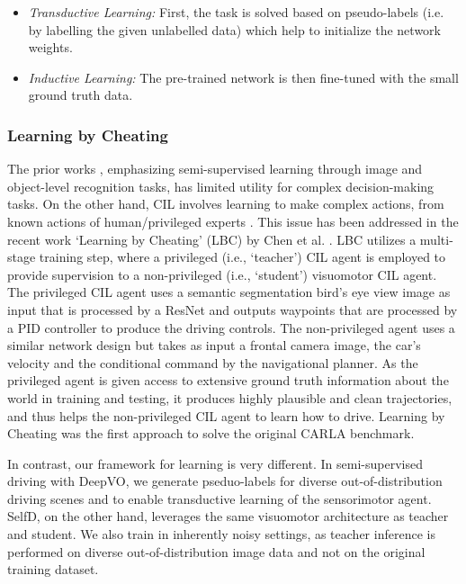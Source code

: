 \documentclass[letterpaper, 12pt]{book}
\theoremstyle{definition}
\theoremstyle{definition}
\theoremstyle{definition}
\theoremstyle{definition}
\theoremstyle{definition}
\begin{document}
\begin{itemize}
\item \emph{Transductive Learning:} First, the task is solved based on pseudo-labels
(i.e. by labelling the given unlabelled data) which help to initialize the
network weights.
\item \emph{Inductive Learning:} The pre-trained network is then fine-tuned with the
small ground truth data.
\end{itemize}

\subsubsection{Learning by Cheating}
\label{sec:orgc656657}
The prior works \cite{Caine2021,Yang2021, Lee2013,Rizve2021}, emphasizing
semi-supervised learning through image and object-level recognition tasks, has
limited utility for complex decision-making tasks. On the other hand, CIL
involves learning to make complex actions, from known actions of
human/privileged experts \cite{Codevilla2017,Codevilla2019,Prakash2021}. This
issue has been addressed in the recent work `Learning by Cheating' (LBC) by Chen
et al. \cite{Chen2019}. LBC utilizes a multi-stage training step, where a
privileged (i.e., ‘teacher’) CIL agent is employed to provide supervision to a
non-privileged (i.e., ‘student’) visuomotor CIL agent. The privileged CIL agent
uses a semantic segmentation bird’s eye view image as input that is processed by
a ResNet and outputs waypoints that are processed by a PID controller to produce
the driving controls. The non-privileged agent uses a similar network design but
takes as input a frontal camera image, the car’s velocity and the conditional
command by the navigational planner. As the privileged agent is given access to
extensive ground truth information about the world in training and testing, it
produces highly plausible and clean trajectories, and thus helps the
non-privileged CIL agent to learn how to drive. Learning by Cheating was the
first approach to solve the original CARLA benchmark.


In contrast, our framework for learning is very different. In semi-supervised
driving with DeepVO, we generate pseduo-labels for diverse out-of-distribution
driving scenes and to enable transductive learning of the sensorimotor
agent. SelfD, on the other hand, leverages the same visuomotor architecture as
teacher and student. We also train in inherently noisy settings, as teacher
inference is performed on diverse out-of-distribution image data and not on the
original training dataset.
\end{document}
